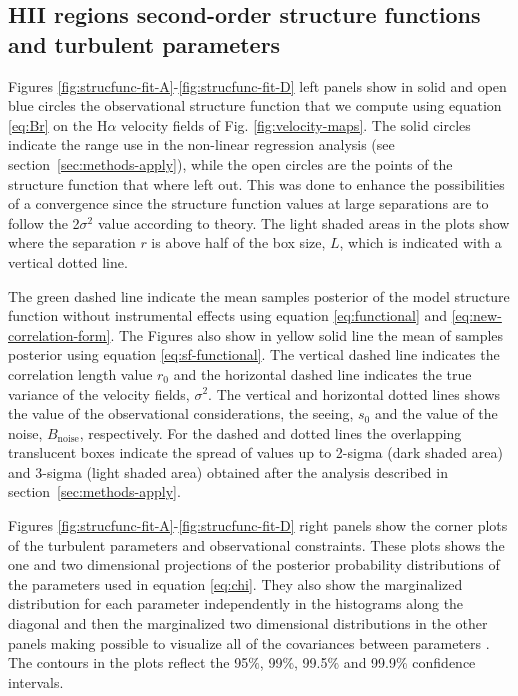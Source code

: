 \documentclass[fleqn,usenatbib, useAMS, a4paper]{mnras}
\newcommand\ha{\ensuremath{\text{H}\alpha}}
\begin{document}
\subsection{HII regions second-order structure functions and turbulent parameters}

Figures \ref{fig:strucfunc-fit-A}-\ref{fig:strucfunc-fit-D} left panels show in solid and open blue circles the observational structure function that we compute using equation \ref{eq:Br} on the \ha{} velocity fields of Fig. \ref{fig:velocity-maps}. The solid circles indicate the range use in the non-linear regression analysis (see section~\ref{sec:methods-apply}), while the open circles are the points of the structure function that where left out.
This was done to enhance the possibilities of a convergence since the structure function values at large separations are to follow the 2\(\sigma^2\) value according to theory.
The light shaded areas in the plots show where the separation \(r\) is above half of the box size, \(L\), which is indicated with a vertical dotted line.

The green dashed line indicate the mean samples posterior of the model structure function without instrumental effects using equation \ref{eq:functional} and \ref{eq:new-correlation-form}.
The Figures also show in yellow solid line the mean of samples posterior using equation \ref{eq:sf-functional}.
The vertical dashed line indicates the correlation length value \(r_0\) and the horizontal dashed line indicates the true variance of the velocity fields, \(\sigma^2\).
The vertical and horizontal dotted lines shows the value of the observational considerations, the seeing, \(s_0\) and the value of the noise, \(B_{\text{noise}}\), respectively.
For the dashed and dotted lines the overlapping translucent boxes indicate the spread of values up to 2-sigma (dark shaded area) and 3-sigma (light shaded area) obtained after the analysis described in section~\ref{sec:methods-apply}.

Figures \ref{fig:strucfunc-fit-A}-\ref{fig:strucfunc-fit-D} right panels show the corner plots \citep{2017ascl.soft02002F} of the turbulent parameters and observational constraints. 
These plots shows the one and two dimensional projections of the posterior probability distributions of the parameters used in equation \ref{eq:chi}.
They also show the marginalized distribution for each parameter independently in the histograms along the diagonal and then the marginalized two dimensional distributions in the other panels making possible to visualize all of the covariances between parameters \citep{2017ascl.soft02002F}.
The contours in the plots reflect the 95\(\%\), 99\(\%\), 99.5\(\%\) and 99.9\(\%\) confidence intervals.
\end{document}
